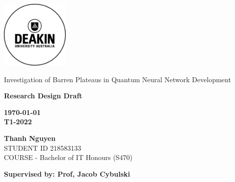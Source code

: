 \thispagestyle{empty}
\begin{titlepage}
    \includegraphics[width=0.25\textwidth]{src/CoverPage/Deakin_Logo.jpeg}
        \begin{center}
        \vspace*{4cm}
        {\LARGE Investigation of Barren Plateaus in Quantum Neural Network Development}
        \vspace{3cm}
            \begin{large}   
    
        
            \bf Research Design Draft
            \vspace{1cm}
        
            \bf \today \\
            T1-2022        
        
            \vspace{3cm}
            \textbf{Thanh Nguyen}\\
            STUDENT ID 218583133 \\
            COURSE - Bachelor of IT Honours (S470)
            \vfill

            \bf \normalsize Supervised by: Prof, Jacob Cybulski\\
       
        \end{large}  
   \end{center}
\end{titlepage}

